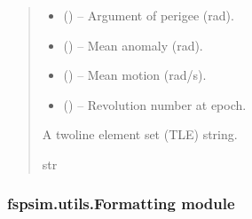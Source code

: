 \documentclass[letterpaper,10pt,english]{sphinxmanual}
\begin{document}
\begin{fulllineitems}
\begin{quote}
\begin{description}
\begin{itemize}
\item {} 
\sphinxAtStartPar
{} () – Argument of perigee (rad).

\item {} 
\sphinxAtStartPar
{} () – Mean anomaly (rad).

\item {} 
\sphinxAtStartPar
{} () – Mean motion (rad/s).

\item {} 
\sphinxAtStartPar
{} () – Revolution number at epoch.

\end{itemize}

\sphinxAtStartPar
A two\sphinxhyphen{}line element set (TLE) string.

\sphinxAtStartPar
str

\end{description}\end{quote}

\end{fulllineitems}



\subsubsection{fspsim.utils.Formatting module}
\label{\detokenize{fspsim.utils:module-fspsim.utils.Formatting}}\label{\detokenize{fspsim.utils:fspsim-utils-formatting-module}}
\end{document}
